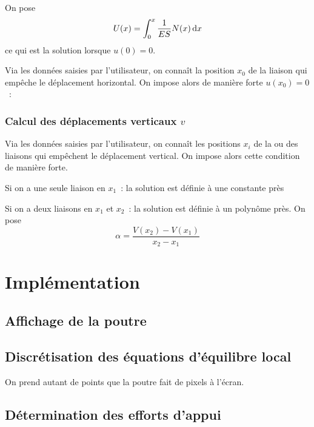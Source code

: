 \documentclass[draft]{report}
\begin{document}
On pose
\[ U(x) = \int_0^x \dfrac{1}{ES} N(x) \, \mathrm d x \]
ce qui est la solution lorsque $u(0) = 0$.

Via les données saisies par l'utilisateur, on connaît la position $x_0$ de la liaison qui empêche le déplacement horizontal. On impose alors de manière forte $u(x_0) = 0$~:


\subsection{Calcul des déplacements verticaux $v$}

Via les données saisies par l'utilisateur, on connaît les positions $x_i$ de la ou des liaisons qui empêchent le déplacement vertical. On impose alors cette condition de manière forte.

Si on a une seule liaison en $x_1$~: la solution est définie à une constante près

Si on a deux liaisons en $x_1$ et $x_2$~: la solution est définie à un polynôme près. On pose
\[ \alpha = \dfrac{ V(x_2)-V(x_1) }{ x_2-x_1 } \]


\chapter{Implémentation}

\section{Affichage de la poutre}


\section{Discrétisation des équations d'équilibre local}

On prend autant de points que la poutre fait de pixels à l'écran.

\section{Détermination des efforts d'appui}
\end{document}
